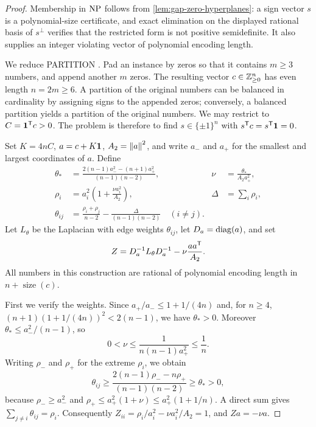 \begin{proof}
Membership in $\mathrm{NP}$ follows from \cref{lem:gap-zero-hyperplanes}: a sign
vector $s$ is a polynomial-size certificate, and exact elimination on
the displayed rational basis of $s^\perp$ verifies that the restricted
form is not positive semidefinite. It also supplies an integer violating
vector of polynomial encoding length.

We reduce PARTITION \citep{Karp1972}. Pad an instance by zeros so that
it contains $m\ge3$ numbers, and append another $m$ zeros. The resulting
vector $c\in\mathbb Z_{\ge0}^n$ has even length $n=2m\ge6$. A partition of the
original numbers can be balanced in cardinality by assigning signs to
the appended zeros; conversely, a balanced partition yields a partition
of the original numbers. We may restrict to
$C=\mathbf 1^{\mathsf T} c>0$. The problem is therefore to find
$s\in\{\pm1\}^n$ with $s^{\mathsf T} c=s^{\mathsf T}\mathbf 1=0$.

Set $K=4nC$, $a=c+K\mathbf 1$, $A_2=\left\lVert a\right\rVert^2$, and write $a_-$ and $a_+$
for the smallest and largest coordinates of $a$. Define
\begin{align*}
 \theta_*&=
 \frac{2(n-1)a_-^2-(n+1)a_+^2}{(n-1)(n-2)},
 &\nu&=\frac{\theta_*}{A_2a_+^2},\\
 \rho_i&=a_i^2\left(1+\frac{\nu a_i^2}{A_2}\right),
 &\Delta&=\sum_i\rho_i,\\
 \theta_{ij}&=\frac{\rho_i+\rho_j}{n-2}
              -\frac{\Delta}{(n-1)(n-2)}\quad(i\ne j).
\end{align*}
Let $L_\theta$ be the Laplacian with edge weights $\theta_{ij}$, let
$D_a=\operatorname{diag}(a)$, and set
\begin{equation}\label{eq:gap-zero-construction}
 Z=D_a^{-1}L_\theta D_a^{-1}-\nu\frac{aa^{\mathsf T}}{A_2}.
\end{equation}
All numbers in this construction are rational of polynomial encoding
length in $n+\operatorname{size}(c)$.

First we verify the weights. Since
$a_+/a_-\le1+1/(4n)$ and, for $n\ge4$,
$(n+1)(1+1/(4n))^2<2(n-1)$, we have $\theta_*>0$.
Moreover $\theta_*\le a_-^2/(n-1)$, so
\begin{equation}\label{eq:gap-zero-nu-bound}
 0<\nu\le\frac1{n(n-1)a_+^2}\le\frac1n.
\end{equation}
Writing $\rho_-$ and $\rho_+$ for the extreme $\rho_i$, we obtain
\[
 \theta_{ij}\ge
 \frac{2(n-1)\rho_- -n\rho_+}{(n-1)(n-2)}
 \ge\theta_*>0,
\]
because $\rho_-\ge a_-^2$ and
$\rho_+\le a_+^2(1+\nu)\le a_+^2(1+1/n)$.
A direct sum gives $\sum_{j\ne i}\theta_{ij}=\rho_i$.
Consequently $Z_{ii}=\rho_i/a_i^2-\nu a_i^2/A_2=1$, and
$Za=-\nu a$.


\end{proof}

